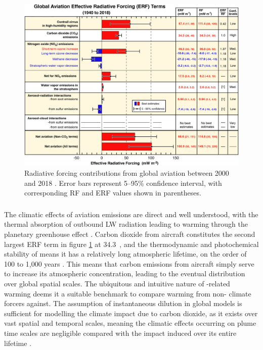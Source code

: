 \begin{figure}[H]
  \centering
  \includegraphics[width=0.9\linewidth]{Lee2021.jpg}
  \caption{Radiative forcing contributions from global aviation between 2000 and 2018 \cite{Lee2021}. Error bars represent 5--95\% confidence interval, with corresponding RF and ERF values shown in parentheses.}
  \label{Lee2021}
\end{figure}

\subsubsection{}
The climatic effects of aviation  emissions are direct and well understood, with the thermal absorption of outbound LW radiation leading to warming through the planetary greenhouse effect \cite{Schneider1989}. Carbon dioxide from aircraft constitutes the second largest ERF term in figure \ref{Lee2021} at 34.3~, and the thermodynamic and photochemical stability of  means it has a relatively long atmospheric lifetime, on the order of 100 to 1,000 years \cite{Archer2008}. This means that carbon emissions from aircraft simply serve to increase its atmospheric concentration, leading to the eventual distribution over global spatial scales. The ubiquitous and intuitive nature of -related warming deems it a suitable benchmark to compare warming from non- climate forcers against. The assumption of instantaneous dilution in global models is sufficient for modelling the climate impact due to carbon dioxide, as it exists over vast spatial and temporal scales, meaning the climatic effects occurring on plume time scales are negligible compared with the impact induced over its entire lifetime \cite{Paoli2011}.


